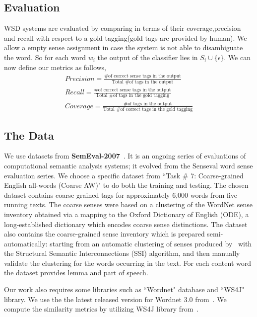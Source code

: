 \documentclass[12pt,letterpaper]{article}
\newcommand{\blue}[1]{\textcolor{RoyalBlue}{#1}}
\newcommand{\instructions}[1]{\blue{\textit{#1}}}
\begin{document}
\subsection{Evaluation}
WSD systems are evaluated by comparing in terms of their coverage,precision and recall with respect to a gold tagging(gold tags are provided by human). We allow a empty sense assignment in case the system is not able to disambiguate the word. So for each word $w_i$ the output of the classifier lies in $S_i \cup \{\epsilon\}$. We can now define  our metrics as follows,
\begin{align*}
Precision = \frac{\text{\# of correct sense tags in the output}}{\text{Total \# of tags in the output}}\\
Recall =\frac{\text{\# of correct sense tags in the output}}{\text{Total \# of tags in the gold tagging}}\\
Coverage =\frac{\text{\# of tags in the output}}{\text{Total \# of correct tags in the gold tagging}}
\end{align*}
\subsection{The Data}
\label{sec:data}
We use datasets from \textbf{SemEval-2007}~\cite{semeval}. It is an ongoing series of evaluations of computational semantic analysis systems; it evolved from the Senseval word sense evaluation series. We choose a specific dataset from ``Task \# 7: Coarse-grained English all-words (Coarse AW)" to do both the training and testing. The chosen dataset contains coarse grained tags for approximately 6,000 words from five running texts. The coarse senses were based on a clustering of the WordNet sense inventory obtained via a mapping to the Oxford Dictionary of English (ODE), a long-established dictionary which encodes coarse sense distinctions. The dataset also contains the coarse-grained sense inventory which is prepared semi-automatically: starting from an automatic clustering of senses produced by~\cite{Navigli06} with the Structural Semantic Interconnections (SSI) algorithm, and then manually validate the clustering for the words occurring in the text. For each content word the dataset provides lemma and part of speech.

Our work also requires some libraries such as ``Wordnet" database and ``WS4J" library. We use the the latest released version for Wordnet 3.0 from~\cite{wordneturl}. We compute the similarity metrics by utilizing WS4J library from~\cite{WS4Jurl}.
\end{document}
